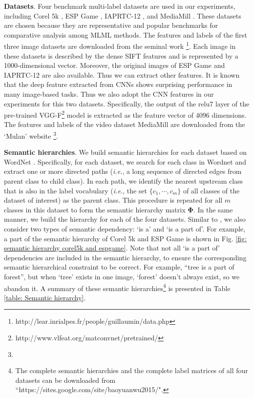 \documentclass[twocolumn]{svjour3}          %
\newcommand{\B}{\mathbf{B}}
\begin{document}
\noindent\textbf{Datasets}. Four benchmark multi-label datasets are used in our experiments, including Corel 5k \cite{corel5k-eccv-2002}, ESP Game \cite{esp-game-2004}, IAPRTC-12 \cite{iaprtc-12-data-2006}, and MediaMill \cite{mediamill-data-2006}. These datasets are chosen because they are representative and popular benchmarks for comparative analysis among MLML methods. 
The features and labels of the first three image datasets are downloaded from the seminal work \cite{multilabel-dataset-image-iccv-2009} \footnote{http://lear.inrialpes.fr/people/guillaumin/data.php}. 
Each image in these datasets is described by the dense SIFT features and is represented by a 1000-dimensional vector.
Moreover, the original images of ESP Game and IAPRTC-12 are also available. Thus we can extract other features. It is known that the deep feature extracted from CNNs shows surprising performance in many image-based tasks. Thus we also adopt the CNN features in our experiments for this two datasets. Specifically, the output of the relu7 layer of the pre-trained VGG-F\footnote{http://www.vlfeat.org/matconvnet/pretrained/} \cite{vggf-bmvc-2014} model is extracted as the feature vector of 4096 dimensions. 
The features and labels of the video dataset MediaMill are downloaded from the `Mulan' website \footnote{}.


\vspace{4pt}\noindent \textbf{Semantic hierarchies}. We build semantic hierarchies for each dataset based on WordNet \cite{wordnet-1998}. Specifically, for each dataset, we search for each class in Wordnet and extract one or %
more directed paths ({\it i.e.}, a long sequence of directed edges from parent class to child class).
In each path, we identify the nearest upstream class that is also in the label vocabulary ({\it i.e.}, the set $\{c_1,\cdots,c_m\}$ of all classes of the dataset of interest) as the parent class. This procedure is repeated for all $m$ classes in this dataset to form the semantic hierarchy matrix $\mathbf{\Phi}$. In the same manner, we build the hierarchy for each of the four datasets. 
Similar to \cite{hierarchy-image-annotation-review-pr-2012}, we also consider two types of semantic dependency: `is a' and `is a part of'. For example, a part of the semantic hierarchy of Corel 5k and ESP Game is shown in Fig. \ref{fig: semantic hierarchy corel5k and espgame}.
Note that not all `is a part of' dependencies are included in the semantic hierarchy, to ensure the corresponding semantic hierarchical constraint to be correct. For example, ``tree is a part of forest'', but when `tree' exists in one image, `forest' doesn’t always exist, so we abandon it.
 A summary of these semantic hierarchies\footnote{The complete semantic hierarchies and the complete label matrices of all four datasets can be downloaded from ``https://sites.google.com/site/baoyuanwu2015/".}
 is presented in Table \ref{table: Semantic hierarchy}.
 
\end{document}
